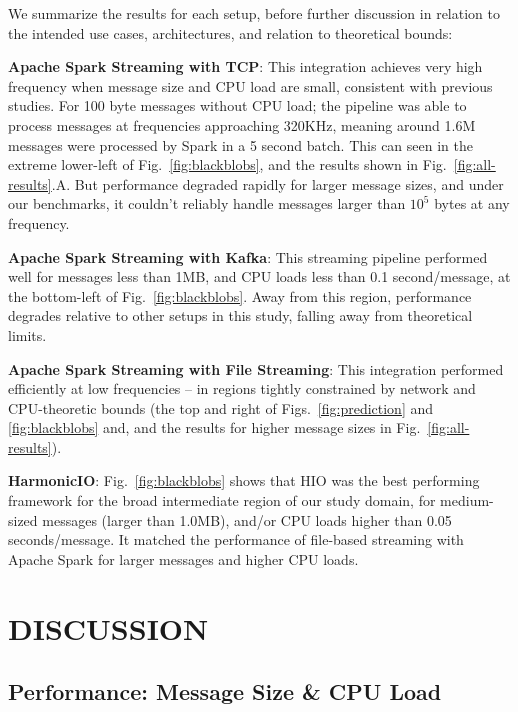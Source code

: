 \documentclass[conference]{IEEEtran}
\begin{document}
We summarize the results for each setup, before further discussion in relation to the intended use cases, architectures, and relation to theoretical bounds:%

\textbf{Apache Spark Streaming with TCP}: 
This integration achieves very high frequency when message size and CPU load are small, consistent with previous studies. For 100 byte messages without CPU load; the pipeline was able to process messages at frequencies approaching 320KHz, meaning around 1.6M messages were processed by Spark in a 5 second batch. This can seen in the extreme lower-left of Fig.~\ref{fig:blackblobs}, and the results shown in Fig.~\ref{fig:all-results}.A. 
But performance degraded rapidly for larger message sizes, and under our benchmarks, it couldn't reliably handle messages larger than $10^5$ bytes at any frequency.

\textbf{Apache Spark Streaming with Kafka}:
This streaming pipeline performed well for messages less than 1MB, and CPU loads  less than 0.1 second/message, at the bottom-left of Fig.~\ref{fig:blackblobs}. Away from this region, performance degrades relative to other setups in this study, falling away from theoretical limits.

\textbf{Apache Spark Streaming with File Streaming}: 
This integration performed efficiently at low frequencies -- in regions tightly constrained by network and CPU-theoretic bounds (the top and right of Figs.~\ref{fig:prediction} and \ref{fig:blackblobs} and, and the results for higher message sizes in Fig.~\ref{fig:all-results}).

\textbf{HarmonicIO}:
Fig.~\ref{fig:blackblobs} shows that HIO was the best performing framework for the broad intermediate region of our study domain, 
for medium-sized messages (larger than 1.0MB), and/or CPU loads higher than 0.05 seconds/message. It matched the performance of file-based streaming with Apache Spark for larger messages and higher CPU loads.%

\section{DISCUSSION}\label{discussion}

\subsection{Performance: Message Size \& CPU Load}
\end{document}
